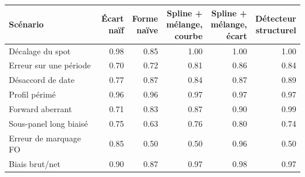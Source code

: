{\small\begin{tabular}{lrrrrr}
\toprule
Scénario & \makecell{Écart\\naïf} & \makecell{Forme\\naïve} & \makecell{Spline +\\mélange,\\courbe} & \makecell{Spline +\\mélange,\\écart} & \makecell{Détecteur\\structurel} \\
\midrule
Décalage du spot & \num{0.98} & \num{0.85} & \num{1.00} & \num{1.00} & \num{1.00} \\
Erreur sur une période & \num{0.70} & \num{0.72} & \num{0.81} & \num{0.86} & \num{0.84} \\
Désaccord de date & \num{0.77} & \num{0.87} & \num{0.84} & \num{0.87} & \num{0.89} \\
Profil périmé & \num{0.96} & \num{0.96} & \num{0.97} & \num{0.97} & \num{0.97} \\
Forward aberrant & \num{0.71} & \num{0.83} & \num{0.87} & \num{0.90} & \num{0.99} \\
Sous-panel long biaisé & \num{0.75} & \num{0.63} & \num{0.76} & \num{0.80} & \num{0.74} \\
Erreur de marquage FO & \num{0.85} & \num{0.50} & \num{0.50} & \num{0.96} & \num{0.50} \\
Biais brut/net & \num{0.90} & \num{0.87} & \num{0.97} & \num{0.98} & \num{0.97} \\
\bottomrule
\end{tabular}}
